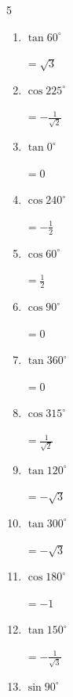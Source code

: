 \begin{multicols}{5}
\begin{enumerate}
        $\displaystyle =-\frac{1}{\sqrt{2}}$

  \item $\displaystyle \tan{60^\circ}$

        $\displaystyle =\sqrt{3}$

  \item $\displaystyle \cos{225^\circ}$

        $\displaystyle =-\frac{1}{\sqrt{2}}$

  \item $\displaystyle \tan{0^\circ}$

        $\displaystyle =0$

  \item $\displaystyle \cos{240^\circ}$

        $\displaystyle =-\frac{1}{2}$

  \item $\displaystyle \cos{60^\circ}$

        $\displaystyle =\frac{1}{2}$

  \item $\displaystyle \cos{90^\circ}$

        $\displaystyle =0$

  \item $\displaystyle \tan{360^\circ}$

        $\displaystyle =0$

  \item $\displaystyle \cos{315^\circ}$

        $\displaystyle =\frac{1}{\sqrt{2}}$

  \item $\displaystyle \tan{120^\circ}$

        $\displaystyle =-\sqrt{3}$

  \item $\displaystyle \tan{300^\circ}$

        $\displaystyle =-\sqrt{3}$

  \item $\displaystyle \cos{180^\circ}$

        $\displaystyle =-1$

  \item $\displaystyle \tan{150^\circ}$

        $\displaystyle =-\frac{1}{\sqrt{3}}$

\columnbreak %

  \item $\displaystyle \sin{90^\circ}$


\end{enumerate}
\end{multicols}

